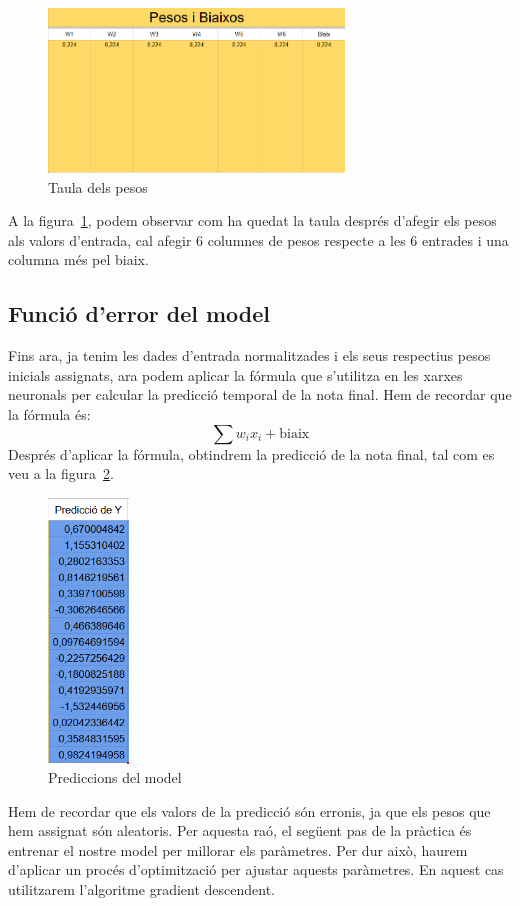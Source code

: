 \begin{figure}[h!]
    \centering
    \includegraphics[width=0.7\textwidth]{./figures/Pesos.png}
    \caption{Taula dels pesos}
    \label{f:pesos}
\end{figure}

A la figura~\ref{f:pesos}, podem observar com ha quedat la taula després d'afegir els pesos als valors d'entrada, cal afegir 6 columnes de pesos respecte a les 6 entrades i una columna més pel biaix.

\subsection{Funció d'error del model}
Fins ara, ja tenim les dades d'entrada normalitzades i els seus respectius pesos inicials assignats, ara podem aplicar la fórmula que s'utilitza en les xarxes neuronals per calcular la predicció temporal de la nota final. Hem de recordar que la fórmula és:
$$\sum w_i x_i + \text{biaix}$$
Després d'aplicar la fórmula, obtindrem la predicció de la nota final, tal com es veu a la figura~\ref{f:Predicciones}.
\begin{figure}[h!]
    \centering
    \includegraphics[width=0.19\textwidth]{./figures/Predicciones.png}
    \caption{Prediccions del model}
    \label{f:Predicciones}
 \end{figure}
Hem de recordar que els valors de la predicció són erronis, ja que els pesos que hem assignat són aleatoris. Per aquesta raó, el següent pas de la pràctica és entrenar el nostre model per millorar els paràmetres. Per dur això, haurem d'aplicar un procés d'optimització per ajustar aquests paràmetres. En aquest cas utilitzarem l'algoritme gradient descendent.

